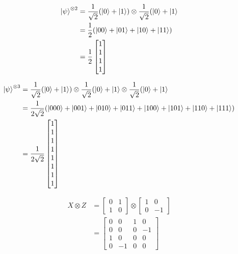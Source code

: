 \begin{align*}
	\ket{\psi}^{\otimes 2} &= \frac{1}{\sqrt{2}} (\ket{0} + \ket{1}) \otimes \frac{1}{\sqrt{2}} (\ket{0} + \ket{1}\\
		&= \frac{1}{2} (\ket{00}  + \ket{01} + \ket{10} + \ket{11}  )\\
		&= \frac{1}{2} \begin{bmatrix}
			1 \\
			1 \\
			1 \\
			1
		\end{bmatrix}
\end{align*}

\begin{align*}
	\ket{\psi}^{\otimes 3} &= \frac{1}{\sqrt{2}} (\ket{0} + \ket{1}) \otimes \frac{1}{\sqrt{2}} (\ket{0} + \ket{1}  \otimes \frac{1}{\sqrt{2}} (\ket{0} + \ket{1}\\
		&= \frac{1}{2\sqrt{2}} (\ket{000}  + \ket{001} + \ket{010} + \ket{011} +  \ket{100}  + \ket{101} + \ket{110} + \ket{111})\\
		&= \frac{1}{2\sqrt{2}} \begin{bmatrix}
			1 \\
			1 \\
			1 \\
			1 \\
			1 \\
			1 \\
			1 \\
			1
		\end{bmatrix}
\end{align*}


\begin{align*}
	X \otimes Z &= \begin{bmatrix}
		0 & 1 \\
		1 & 0
	\end{bmatrix}
	\otimes
	\begin{bmatrix}
		1 & 0 \\
		0 & -1
	\end{bmatrix} \\
	&= \begin{bmatrix}
		0 & 0 & 1 & 0 \\
		0 & 0 & 0 & -1 \\
		1 & 0 & 0 & 0 \\
		0 & -1 & 0 & 0
	\end{bmatrix}
\end{align*}

